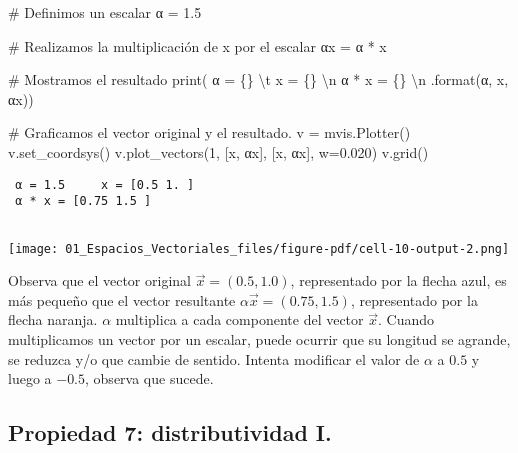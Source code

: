 \documentclass[
  letterpaper,
  DIV=11,
  numbers=noendperiod]{scrreprt}
\newenvironment{Shaded}{\begin{snugshade}}{\end{snugshade}}
\newcommand{\BuiltInTok}[1]{\textcolor[rgb]{0.00,0.23,0.31}{#1}}
\newcommand{\CharTok}[1]{\textcolor[rgb]{0.13,0.47,0.30}{#1}}
\newcommand{\CommentTok}[1]{\textcolor[rgb]{0.37,0.37,0.37}{#1}}
\newcommand{\DecValTok}[1]{\textcolor[rgb]{0.68,0.00,0.00}{#1}}
\newcommand{\FloatTok}[1]{\textcolor[rgb]{0.68,0.00,0.00}{#1}}
\newcommand{\NormalTok}[1]{\textcolor[rgb]{0.00,0.23,0.31}{#1}}
\newcommand{\OperatorTok}[1]{\textcolor[rgb]{0.37,0.37,0.37}{#1}}
\newcommand{\SpecialCharTok}[1]{\textcolor[rgb]{0.37,0.37,0.37}{#1}}
\newcommand{\StringTok}[1]{\textcolor[rgb]{0.13,0.47,0.30}{#1}}
\begin{document}
\begin{Shaded}
\begin{Highlighting}[]
\CommentTok{\# Definimos un escalar}
\NormalTok{α }\OperatorTok{=} \FloatTok{1.5}

\CommentTok{\# Realizamos la multiplicación de x por el escalar}
\NormalTok{αx }\OperatorTok{=}\NormalTok{ α }\OperatorTok{*}\NormalTok{ x}

\CommentTok{\# Mostramos el resultado}
\BuiltInTok{print}\NormalTok{(}\StringTok{\textquotesingle{} α = }\SpecialCharTok{\{\}}\StringTok{ }\CharTok{\textbackslash{}t}\StringTok{ x = }\SpecialCharTok{\{\}}\StringTok{ }\CharTok{\textbackslash{}n}\StringTok{ α * x = }\SpecialCharTok{\{\}}\StringTok{  }\CharTok{\textbackslash{}n}\StringTok{ \textquotesingle{}}\NormalTok{.}\BuiltInTok{format}\NormalTok{(α, x, αx))}

\CommentTok{\# Graficamos el vector original y el resultado.}
\NormalTok{v }\OperatorTok{=}\NormalTok{ mvis.Plotter()}
\NormalTok{v.set\_coordsys()}
\NormalTok{v.plot\_vectors(}\DecValTok{1}\NormalTok{, [x, αx], [}\StringTok{\textquotesingle{}x\textquotesingle{}}\NormalTok{, }\StringTok{\textquotesingle{}αx\textquotesingle{}}\NormalTok{], w}\OperatorTok{=}\FloatTok{0.020}\NormalTok{)}
\NormalTok{v.grid()}
\end{Highlighting}
\end{Shaded}

\begin{verbatim}
 α = 1.5     x = [0.5 1. ] 
 α * x = [0.75 1.5 ]  
 
\end{verbatim}

\texttt{[image: 01\_Espacios\_Vectoriales\_files/figure-pdf/cell-10-output-2.png]}

Observa que el vector original \(\vec{x} = (0.5, 1.0)\), representado
por la flecha azul, es más pequeño que el vector resultante
\(\alpha \vec{x} = (0.75, 1.5)\), representado por la flecha naranja.
\(\alpha\) multiplica a cada componente del vector \(\vec{x}\). Cuando
multiplicamos un vector por un escalar, puede ocurrir que su longitud se
agrande, se reduzca y/o que cambie de sentido. Intenta modificar el
valor de \(\alpha\) a \(0.5\) y luego a \(-0.5\), observa que sucede.

\subsection{Propiedad 7: distributividad
I.}\label{propiedad-7-distributividad-i.}
\end{document}
